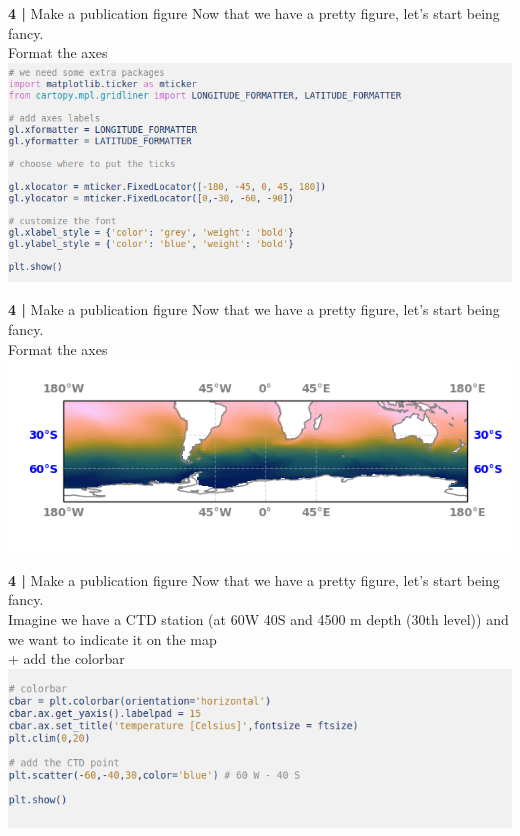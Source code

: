  
\begin{frame}{\textbf{4 |} Make a publication figure} 
    Now that we have a pretty figure, let's start being fancy.\\
        \vspace{0.5cm}
    Format the axes 
    \includegraphics[scale=0.35]{images/Script2_step3.png}
\end{frame}


\begin{frame}{\textbf{4 |} Make a publication figure} 
    Now that we have a pretty figure, let's start being fancy.\\
        \vspace{0.5cm}
    Format the axes \\
    \includegraphics[scale=0.45]{images/script2_fig3.png}
\end{frame}


\begin{frame}{\textbf{4 |} Make a publication figure} 
    Now that we have a pretty figure, let's start being fancy.\\
        \vspace{0.5cm}
    Imagine we have a CTD station (at 60W 40S and 4500 m depth (30th level)) and we want to indicate it on the map\\
    + add the colorbar\\
    \includegraphics[scale=0.35]{images/Script2_step4.png}
\end{frame}


